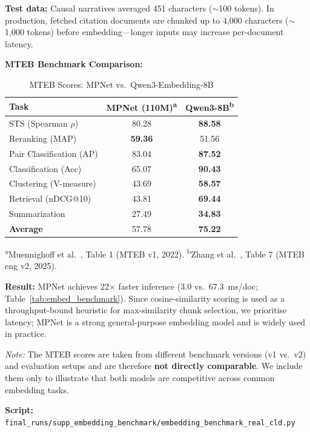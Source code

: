 \textbf{Test data:} Causal narratives averaged 451 characters ($\sim$100 tokens). In production, fetched citation documents are chunked up to 4,000 characters ($\sim$1,000 tokens) before embedding---longer inputs may increase per-document latency.

\textbf{MTEB Benchmark Comparison:}

\begin{table}[H]
\centering
\caption{MTEB Scores: MPNet vs.\ Qwen3-Embedding-8B}
\label{tab:mteb_comparison}
\footnotesize
\begin{tabular}{@{}lcc@{}}
\toprule
\textbf{Task} & \textbf{MPNet (110M)\textsuperscript{a}} & \textbf{Qwen3-8B\textsuperscript{b}} \\
\midrule
STS (Spearman $\rho$) & 80.28 & \textbf{88.58} \\
Reranking (MAP) & \textbf{59.36} & 51.56 \\
Pair Classification (AP) & 83.04 & \textbf{87.52} \\
Classification (Acc) & 65.07 & \textbf{90.43} \\
Clustering (V-measure) & 43.69 & \textbf{58.57} \\
Retrieval (nDCG@10) & 43.81 & \textbf{69.44} \\
Summarization & 27.49 & \textbf{34.83} \\
\midrule
\textbf{Average} & 57.78 & \textbf{75.22} \\
\bottomrule
\end{tabular}

\vspace{0.3em}
\raggedright\scriptsize
\textsuperscript{a}Muennighoff et al.~\cite{muennighoff2023mteb}, Table 1 (MTEB v1, 2022). \textsuperscript{b}Zhang et al.~\cite{qwen3embedding2025}, Table 7 (MTEB eng v2, 2025).
\end{table}

\textbf{Result:} MPNet achieves 22$\times$ faster inference (3.0 vs.\ 67.3~ms/doc; Table~\ref{tab:embed_benchmark}). Since cosine-similarity scoring is used as a throughput-bound heuristic for max-similarity chunk selection, we prioritise latency; MPNet is a strong general-purpose embedding model and is widely used in practice.

\textit{Note:} The MTEB scores are taken from different benchmark versions (v1 vs.\ v2) and evaluation setups and are therefore \textbf{not directly comparable}. We include them only to illustrate that both models are competitive across common embedding tasks.

\textbf{Script:} \texttt{final\_runs/supp\_embedding\_benchmark/embedding\_benchmark\_real\_cld.py}

